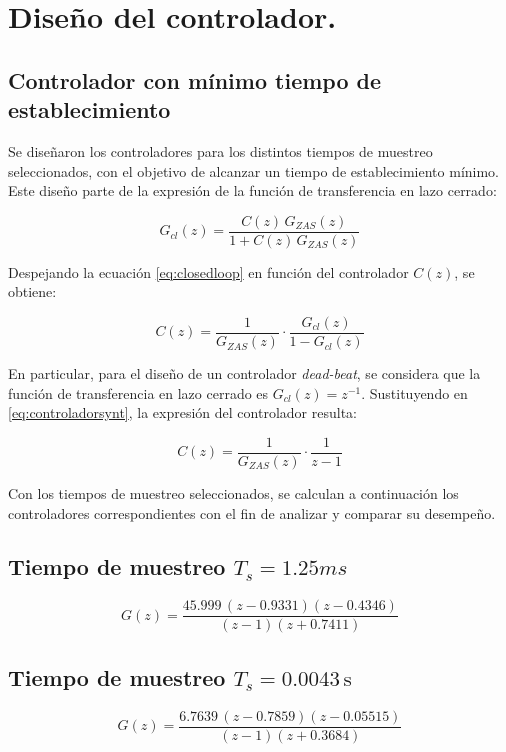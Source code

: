 \section{Diseño del controlador.}

\subsection{Controlador con mínimo tiempo de establecimiento}

Se diseñaron los controladores para los distintos tiempos de muestreo seleccionados, con el objetivo de alcanzar un tiempo de establecimiento mínimo. Este diseño parte de la expresión de la función de transferencia en lazo cerrado:

\begin{equation}
	G_{cl}(z) = \frac{C(z) \, G_{ZAS}(z)}{1 + C(z) \, G_{ZAS}(z)}
	\label{eq:closedloop}
\end{equation}

Despejando la ecuación \eqref{eq:closedloop} en función del controlador $C(z)$, se obtiene:

\begin{equation}
	C(z) = \frac{1}{G_{ZAS}(z)} \cdot \frac{G_{cl}(z)}{1 - G_{cl}(z)}
	\label{eq:controladorsynt}
\end{equation}

En particular, para el diseño de un controlador \emph{dead-beat}, se considera que la función de transferencia en lazo cerrado es $G_{cl}(z) = z^{-1}$. Sustituyendo en \eqref{eq:controladorsynt}, la expresión del controlador resulta:

\begin{equation}
	C(z) = \frac{1}{G_{ZAS}(z)} \cdot \frac{1}{z - 1}
	\label{eq:control1}
\end{equation}

Con los tiempos de muestreo seleccionados, se calculan a continuación los controladores correspondientes con el fin de analizar y comparar su desempeño.


\subsection*{Tiempo de muestreo $T_s = 1.25ms$}
\[
G(z) = \frac{45.999  \, (z - 0.9331)(z - 0.4346)}{(z - 1)(z + 0.7411)}
\]


\subsection*{Tiempo de muestreo $T_s = 0.0043 \, \text{s}$}
\[
G(z) = \frac{6.7639 \, (z - 0.7859)(z - 0.05515)}{(z - 1)(z + 0.3684)}
\]

